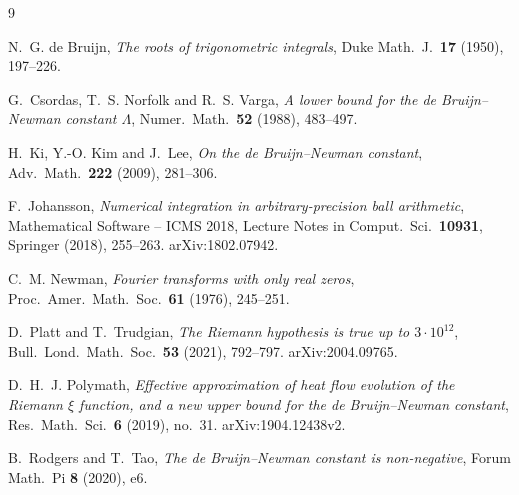 \documentclass[11pt]{article}
\theoremstyle{definition}
\begin{document}
\begin{thebibliography}{9}

N.~G. de Bruijn,
\emph{The roots of trigonometric integrals},
Duke Math.\ J.\ \textbf{17} (1950), 197--226.

G.~Csordas, T.~S. Norfolk and R.~S. Varga,
\emph{A lower bound for the de Bruijn--Newman constant $\Lambda$},
Numer.\ Math.\ \textbf{52} (1988), 483--497.

H.~Ki, Y.-O. Kim and J.~Lee,
\emph{On the de Bruijn--Newman constant},
Adv.\ Math.\ \textbf{222} (2009), 281--306.

F.~Johansson,
\emph{Numerical integration in arbitrary-precision ball
arithmetic},
Mathematical Software -- ICMS 2018, Lecture Notes in Comput.\ Sci.\
\textbf{10931}, Springer (2018), 255--263.
arXiv:1802.07942.

C.~M. Newman,
\emph{Fourier transforms with only real zeros},
Proc.\ Amer.\ Math.\ Soc.\ \textbf{61} (1976), 245--251.

D.~Platt and T.~Trudgian,
\emph{The Riemann hypothesis is true up to $3\cdot10^{12}$},
Bull.\ Lond.\ Math.\ Soc.\ \textbf{53} (2021), 792--797.
arXiv:2004.09765.

D.~H.~J. Polymath,
\emph{Effective approximation of heat flow evolution of the Riemann
$\xi$ function, and a new upper bound for the de Bruijn--Newman
constant},
Res.\ Math.\ Sci.\ \textbf{6} (2019), no.\ 31.
arXiv:1904.12438v2.

B.~Rodgers and T.~Tao,
\emph{The de Bruijn--Newman constant is non-negative},
Forum Math.\ Pi \textbf{8} (2020), e6.

\end{thebibliography}
\end{document}
